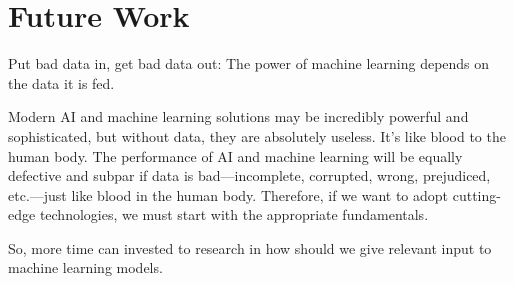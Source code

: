 \chapter*{Future Work}
Put bad data in, get bad data out: The power of machine learning depends on the data it is fed.

Modern AI and machine learning solutions may be incredibly powerful and sophisticated, but without data, they are absolutely useless. It's like blood to the human body. The performance of AI and machine learning will be equally defective and subpar if data is bad—incomplete, corrupted, wrong, prejudiced, etc.—just like blood in the human body. Therefore, if we want to adopt cutting-edge technologies, we must start with the appropriate fundamentals.


So, more time can invested to research in how should we give relevant input to machine learning models.